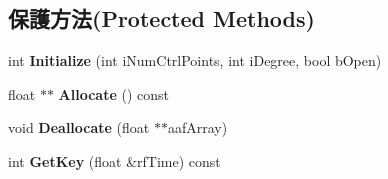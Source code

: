 \subsection*{保護方法(Protected Methods)}
\begin{DoxyCompactItemize}
\item 
int {\bfseries Initialize} (int i\+Num\+Ctrl\+Points, int i\+Degree, bool b\+Open)\hypertarget{class_magnum_1_1_b_spline_basis_ad9e02b34b85f3d49c4eafb5b63ae2fac}{}\label{class_magnum_1_1_b_spline_basis_ad9e02b34b85f3d49c4eafb5b63ae2fac}

\item 
float $\ast$$\ast$ {\bfseries Allocate} () const \hypertarget{class_magnum_1_1_b_spline_basis_ac8179e0a1fe615c7dd7aab69b6adad1b}{}\label{class_magnum_1_1_b_spline_basis_ac8179e0a1fe615c7dd7aab69b6adad1b}

\item 
void {\bfseries Deallocate} (float $\ast$$\ast$aaf\+Array)\hypertarget{class_magnum_1_1_b_spline_basis_a970a334320b3d3f1712fcaff8af0c7c4}{}\label{class_magnum_1_1_b_spline_basis_a970a334320b3d3f1712fcaff8af0c7c4}

\item 
int {\bfseries Get\+Key} (float \&rf\+Time) const \hypertarget{class_magnum_1_1_b_spline_basis_a7b55f991b042a94232c7fd4cc8b3086f}{}\label{class_magnum_1_1_b_spline_basis_a7b55f991b042a94232c7fd4cc8b3086f}

\end{DoxyCompactItemize}

